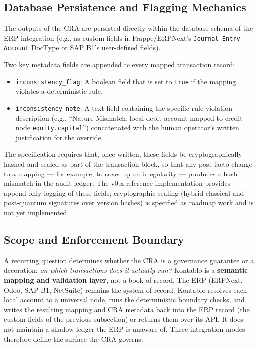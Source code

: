 

\subsection{Database Persistence and Flagging Mechanics}
The outputs of the CRA are persisted directly within the database schema of the ERP integration (e.g., as custom fields in Frappe/ERPNext's \texttt{Journal Entry Account} DocType or SAP B1's user-defined fields). 

Two key metadata fields are appended to every mapped transaction record:
\begin{itemize}
    \item \texttt{inconsistency\_flag}: A boolean field that is set to \texttt{true} if the mapping violates a deterministic rule.
    \item {\sloppy\texttt{inconsistency\_note}: A text field containing the specific rule violation description (e.g., ``Nature Mismatch: local debit account mapped to credit node \texttt{equity.capital}'') concatenated with the human operator's written justification for the override.\par}
\end{itemize}

The specification requires that, once written, these fields be cryptographically hashed and sealed as part of the transaction block, so that any post-facto change to a mapping --- for example, to cover up an irregularity --- produces a hash mismatch in the audit ledger. The v0.x reference implementation provides append-only logging of these fields; cryptographic sealing (hybrid classical and post-quantum signatures over version hashes) is specified as roadmap work and is not yet implemented.

\subsection{Scope and Enforcement Boundary}
\label{subsec:enforcement_boundary}

A recurring question determines whether the CRA is a governance guarantee or a
decoration: \emph{on which transactions does it actually run?} Kontablo is a
\textbf{semantic mapping and validation layer}, not a book of record. The ERP
(ERPNext, Odoo, SAP B1, NetSuite) remains the system of record; Kontablo
resolves each local account to a universal node, runs the deterministic
boundary checks, and writes the resulting mapping and CRA metadata back into
the ERP record (the custom fields of the previous subsection) or returns them
over its API. It does not maintain a shadow ledger the ERP is unaware of.
Three integration modes therefore define the surface the CRA governs:

